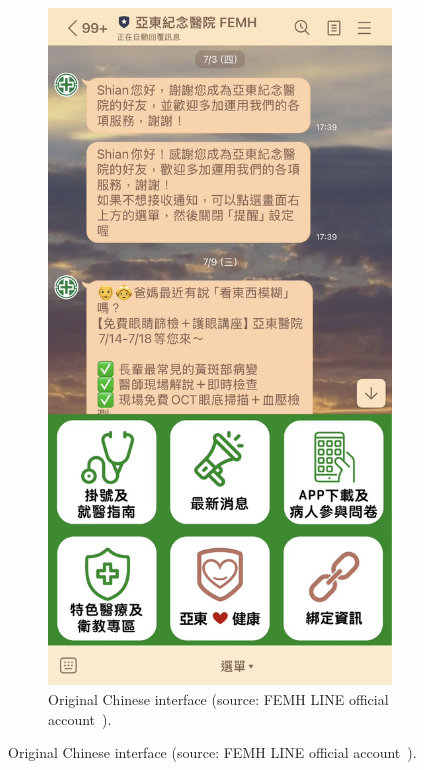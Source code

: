 \begin{figure}[H]
    \centering
    \begin{subfigure}[t]{0.3\textwidth}
        \centering
        \includegraphics[width=\textwidth]{../../images/line.jpg}
        \caption{Original Chinese interface (source: FEMH LINE official account~\cite{femhline}).}

\end{subfigure}
\end{figure}
